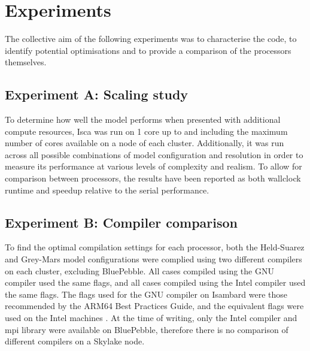 \documentclass[a4paper,11pt]{report}
\begin{document}
\section{Experiments}
\label{sec:experiment-methods}
The collective aim of the following experiments was to characterise the code, to identify potential optimisations and to provide a comparison of the processors themselves.

\subsection{Experiment A: Scaling study}
To determine how well the model performs when presented with additional compute resources, Isca was run on 1 core up to and including the maximum number of cores available on a node of each cluster. Additionally, it was run across all possible combinations of model configuration and resolution in order to measure its performance at various levels of complexity and realism. To allow for comparison between processors, the results have been reported as both wallclock runtime and speedup relative to the serial performance.
\par

\subsection{Experiment B: Compiler comparison}
To find the optimal compilation settings for each processor, both the Held-Suarez and Grey-Mars model configurations were complied using two different compilers on each cluster, excluding BluePebble. All cases compiled using the GNU compiler used the same flags, and all cases compiled using the Intel compiler used the same flags. The flags used for the GNU compiler on Isambard were those recommended by the ARM64 Best Practices Guide, and the equivalent flags were used on the Intel machines \cite{arm2019practices}. At the time of writing, only the Intel compiler and \gls{mpi} library were available on BluePebble, therefore there is no comparison of different compilers on a Skylake node. 
\par
\end{document}
